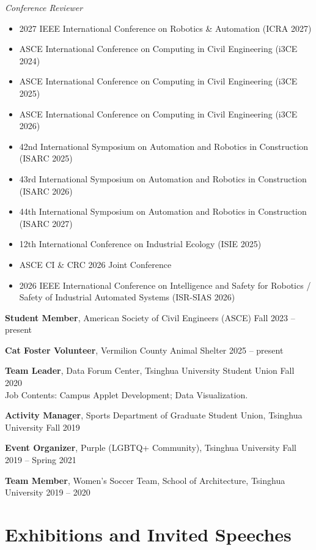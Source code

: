 \documentclass[11pt,a4paper]{article}
\newcommand{\entrytitle}[1]{\textbf{#1}}
\begin{document}
\textit{Conference Reviewer}
\begin{itemize}[nosep, leftmargin=1.5em]
    \item 2027 IEEE International Conference on Robotics \& Automation (ICRA 2027)
    \item ASCE International Conference on Computing in Civil Engineering (i3CE 2024)
    \item ASCE International Conference on Computing in Civil Engineering (i3CE 2025)
    \item ASCE International Conference on Computing in Civil Engineering (i3CE 2026)
    \item 42nd International Symposium on Automation and Robotics in Construction (ISARC 2025)
    \item 43rd International Symposium on Automation and Robotics in Construction (ISARC 2026)
    \item 44th International Symposium on Automation and Robotics in Construction (ISARC 2027)
    \item 12th International Conference on Industrial Ecology (ISIE 2025)
    \item ASCE CI \& CRC 2026 Joint Conference
    \item 2026 IEEE International Conference on Intelligence and Safety for Robotics / Safety of Industrial Automated Systems (ISR-SIAS 2026)
\end{itemize}



\entrytitle{Student Member}, American Society of Civil Engineers (ASCE) \hfill Fall 2023 -- present


\entrytitle{Cat Foster Volunteer}, Vermilion County Animal Shelter \hfill 2025 -- present

\entrytitle{Team Leader}, Data Forum Center, Tsinghua University Student Union \hfill Fall 2020 \\
Job Contents: Campus Applet Development; Data Visualization.

\entrytitle{Activity Manager}, Sports Department of Graduate Student Union, Tsinghua University \hfill Fall 2019

\entrytitle{Event Organizer}, Purple (LGBTQ+ Community), Tsinghua University \hfill Fall 2019 -- Spring 2021

\entrytitle{Team Member}, Women's Soccer Team, School of Architecture, Tsinghua University \hfill 2019 -- 2020

\section{Exhibitions and Invited Speeches}
\end{document}
